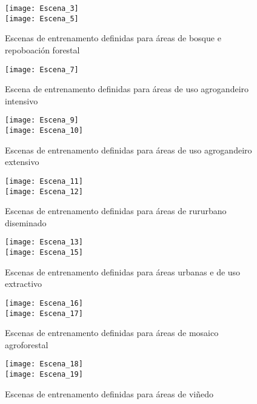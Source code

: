\documentclass[11pt,a4paper]{article}
\begin{document}
\begin{figure}
\caption{Escenas de entrenamento definidas para áreas de bosque e repoboación forestal}\label{fig:escenas2}
\texttt{[image: Escena\_3]}\\
\texttt{[image: Escena\_5]}
\end{figure}

\begin{figure}
\caption{Escena de entrenamento definidas para áreas de uso agrogandeiro intensivo}\label{fig:escenas3}
\texttt{[image: Escena\_7]}
\end{figure}

\begin{figure}
\caption{Escenas de entrenamento definidas para áreas de uso agrogandeiro extensivo}\label{fig:escenas4}
\texttt{[image: Escena\_9]}\\
\texttt{[image: Escena\_10]}
\end{figure}

\begin{figure}
\caption{Escenas de entrenamento definidas para áreas de rururbano diseminado}\label{fig:escenas5}
\texttt{[image: Escena\_11]}\\
\texttt{[image: Escena\_12]}
\end{figure}

\begin{figure}
\caption{Escenas de entrenamento definidas para áreas urbanas e de uso extractivo}\label{fig:escenas6}
\texttt{[image: Escena\_13]}\\
\texttt{[image: Escena\_15]}
\end{figure}

\begin{figure}
\caption{Escenas de entrenamento definidas para áreas de mosaico agroforestal}\label{fig:escenas7}
\texttt{[image: Escena\_16]}\\
\texttt{[image: Escena\_17]}
\end{figure}

\begin{figure}
\caption{Escenas de entrenamento definidas para áreas de viñedo}\label{fig:escenas8}
\texttt{[image: Escena\_18]}\\
\texttt{[image: Escena\_19]}
\end{figure}

\clearpage
\end{document}
